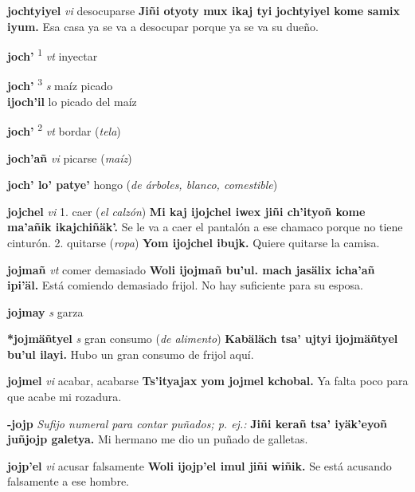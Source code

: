 \documentclass[10pt]{scrbook}
\newcommand{\entry}[1]{\textbf{#1}}
\newcommand{\onedefinition}[1]{#1.}
\newcommand{\defsuperscript}[1]{\textsuperscript{#1}}
\newcommand{\nontranslationdef}[1]{\textit{#1}}
\newcommand{\partofspeech}[1]{\textit{#1}}
\newcommand{\spanishtranslation}[1]{#1}
\newcommand{\clarification}[1]{(\textit{#1})}
\newcommand{\cholexample}[1]{\textbf{#1}}
\newcommand{\exampletranslation}[1]{#1}
\newcommand{\secondaryentry}[1]{\\\textbf{#1}}
\newcommand{\secondtranslation}[1]{#1}
\begin{document}
\begin{multicols}{2}
\entry{jochtyiyel}
\partofspeech{vi}
\spanishtranslation{desocuparse}
\cholexample{Jiñi otyoty mux ikaj tyi jochtyiyel kome samix iyum.}
\exampletranslation{Esa casa ya se va a desocupar porque ya se va su dueño.}

\entry{joch'}
\defsuperscript{1}
\partofspeech{vt}
\spanishtranslation{inyectar}

\entry{joch'}
\defsuperscript{3}
\partofspeech{s}
\spanishtranslation{maíz picado}
\secondaryentry{ijoch'il}
\secondtranslation{lo picado del maíz}

\entry{joch'}
\defsuperscript{2}
\partofspeech{vt}
\spanishtranslation{bordar}
\clarification{tela}

\entry{joch'añ}
\partofspeech{vi}
\spanishtranslation{picarse}
\clarification{maíz}

\entry{joch' lo' patye'}
\spanishtranslation{hongo}
\clarification{de árboles, blanco, comestible}

\entry{jojchel}
\partofspeech{vi}
\onedefinition{1}
\spanishtranslation{caer}
\clarification{el calzón}
\cholexample{Mi kaj ijojchel iwex jiñi ch'ityoñ kome ma'añik ikajchiñäk'.}
\exampletranslation{Se le va a caer el pantalón a ese chamaco porque no tiene cinturón.}
\onedefinition{2}
\spanishtranslation{quitarse}
\clarification{ropa}
\cholexample{Yom ijojchel ibujk.}
\exampletranslation{Quiere quitarse la camisa.}

\entry{jojmañ}
\partofspeech{vt}
\spanishtranslation{comer demasiado}
\cholexample{Woli ijojmañ bu'ul. mach jasälix icha'añ ipi'äl.}
\exampletranslation{Está comiendo demasiado frijol. No hay suficiente para su esposa.}

\entry{jojmay}
\partofspeech{s}
\spanishtranslation{garza}

\entry{*jojmäñtyel}
\partofspeech{s}
\spanishtranslation{gran consumo}
\clarification{de alimento}
\cholexample{Kabäläch tsa' ujtyi ijojmäñtyel bu'ul ilayi.}
\exampletranslation{Hubo un gran consumo de frijol aquí.}

\entry{jojmel}
\partofspeech{vi}
\spanishtranslation{acabar, acabarse}
\cholexample{Ts'ityajax yom jojmel kchobal.}
\exampletranslation{Ya falta poco para que acabe mi rozadura.}

\entry{-jojp}
\nontranslationdef{Sufijo numeral para contar puñados; p. ej.:}
\cholexample{Jiñi kerañ tsa' iyäk'eyoñ juñjojp galetya.}
\exampletranslation{Mi hermano me dio un puñado de galletas.}

\entry{jojp'el}
\partofspeech{vi}
\spanishtranslation{acusar falsamente}
\cholexample{Woli ijojp'el imul jiñi wiñik.}
\exampletranslation{Se está acusando falsamente a ese hombre.}


\end{multicols}
\end{document}
